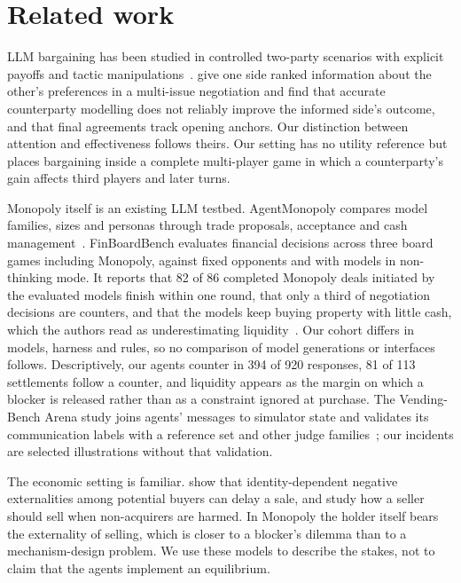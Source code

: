 \documentclass[11pt,letterpaper]{article}
\begin{document}
\section{Related work}
\label{sec:related}

LLM bargaining has been studied in controlled two-party scenarios with explicit payoffs and tactic manipulations~\citep{bianchi2024negotiationarena}. \citet{cosentino2026counterparty} give one side ranked information about the other's preferences in a multi-issue negotiation and find that accurate counterparty modelling does not reliably improve the informed side's outcome, and that final agreements track opening anchors. Our distinction between attention and effectiveness follows theirs. Our setting has no utility reference but places bargaining inside a complete multi-player game in which a counterparty's gain affects third players and later turns.

Monopoly itself is an existing LLM testbed. AgentMonopoly compares model families, sizes and personas through trade proposals, acceptance and cash management~\citep{wu2026agentmonopoly}. FinBoardBench evaluates financial decisions across three board games including Monopoly, against fixed opponents and with models in non-thinking mode. It reports that 82 of 86 completed Monopoly deals initiated by the evaluated models finish within one round, that only a third of negotiation decisions are counters, and that the models keep buying property with little cash, which the authors read as underestimating liquidity~\citep{hu2026finboardbench}. Our cohort differs in models, harness and rules, so no comparison of model generations or interfaces follows. Descriptively, our agents counter in 394 of 920 responses, 81 of 113 settlements follow a counter, and liquidity appears as the margin on which a blocker is released rather than as a constraint ignored at purchase. The Vending-Bench Arena study joins agents' messages to simulator state and validates its communication labels with a reference set and other judge families~\citep{li2026arena}; our incidents are selected illustrations without that validation.

The economic setting is familiar. \citet{jehiel1995delay} show that identity-dependent negative externalities among potential buyers can delay a sale, and \citet{jehiel1996nuclear} study how a seller should sell when non-acquirers are harmed. In Monopoly the holder itself bears the externality of selling, which is closer to a blocker's dilemma than to a mechanism-design problem. We use these models to describe the stakes, not to claim that the agents implement an equilibrium.
\end{document}
